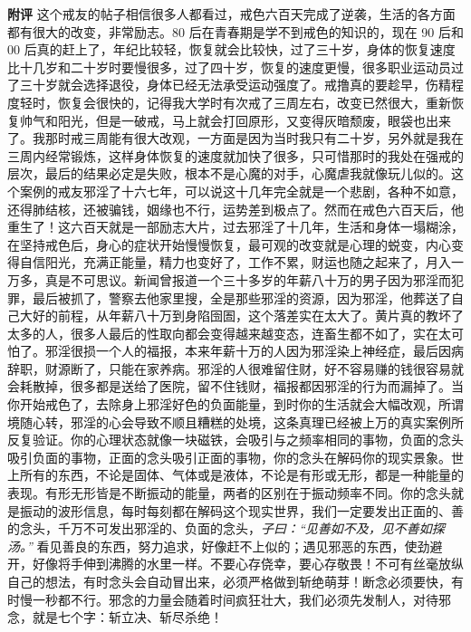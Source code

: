 \begin{case}
    \textbf{附评} 这个戒友的帖子相信很多人都看过，戒色六百天完成了逆袭，生活的各方面都有很大的改变，非常励志。80 后在青春期是学不到戒色的知识的，现在 90 后和 00 后真的赶上了，年纪比较轻，恢复就会比较快，过了三十岁，身体的恢复速度比十几岁和二十岁时要慢很多，过了四十岁，恢复的速度更慢，很多职业运动员过了三十岁就会选择退役，身体已经无法承受运动强度了。戒撸真的要趁早，伤精程度轻时，恢复会很快的，记得我大学时有次戒了三周左右，改变已然很大，重新恢复帅气和阳光，但是一破戒，马上就会打回原形，又变得灰暗颓废，眼袋也出来了。我那时戒三周能有很大改观，一方面是因为当时我只有二十岁，另外就是我在三周内经常锻炼，这样身体恢复的速度就加快了很多，只可惜那时的我处在强戒的层次，最后的结果必定是失败，根本不是心魔的对手，心魔虐我就像玩儿似的。这个案例的戒友邪淫了十六七年，可以说这十几年完全就是一个悲剧，各种不如意，还得肺结核，还被骗钱，姻缘也不行，运势差到极点了。然而在戒色六百天后，他重生了！这六百天就是一部励志大片，过去邪淫了十几年，生活和身体一塌糊涂，在坚持戒色后，身心的症状开始慢慢恢复，最可观的改变就是心理的蜕变，内心变得自信阳光，充满正能量，精力也变好了，工作不累，财运也随之起来了，月入一万多，真是不可思议。新闻曾报道一个三十多岁的年薪八十万的男子因为邪淫而犯罪，最后被抓了，警察去他家里搜，全是那些邪淫的资源，因为邪淫，他葬送了自己大好的前程，从年薪八十万到身陷囹圄，这个落差实在太大了。黄片真的教坏了太多的人，很多人最后的性取向都会变得越来越变态，连畜生都不如了，实在太可怕了。邪淫很损一个人的福报，本来年薪十万的人因为邪淫染上神经症，最后因病辞职，财源断了，只能在家养病。邪淫的人很难留住财，好不容易赚的钱很容易就会耗散掉，很多都是送给了医院，留不住钱财，福报都因邪淫的行为而漏掉了。当你开始戒色了，去除身上邪淫好色的负面能量，到时你的生活就会大幅改观，所谓境随心转，邪淫的心会导致不顺且糟糕的处境，这条真理已经被上万的真实案例所反复验证。你的心理状态就像一块磁铁，会吸引与之频率相同的事物，负面的念头吸引负面的事物，正面的念头吸引正面的事物，你的念头在解码你的现实景象。世上所有的东西，不论是固体、气体或是液体，不论是有形或无形，都是一种能量的表现。有形无形皆是不断振动的能量，两者的区别在于振动频率不同。你的念头就是振动的波形信息，每时每刻都在解码这个现实世界，我们一定要发出正面的、善的念头，千万不可发出邪淫的、负面的念头，\textit{子曰：“见善如不及，见不善如探汤。”} 看见善良的东西，努力追求，好像赶不上似的；遇见邪恶的东西，使劲避开，好像将手伸到沸腾的水里一样。不要心存侥幸，要心存敬畏！不可有丝毫放纵自己的想法，有时念头会自动冒出来，必须严格做到斩绝萌芽！断念必须要快，有时慢一秒都不行。邪念的力量会随着时间疯狂壮大，我们必须先发制人，对待邪念，就是七个字：斩立决、斩尽杀绝！
\end{case}

